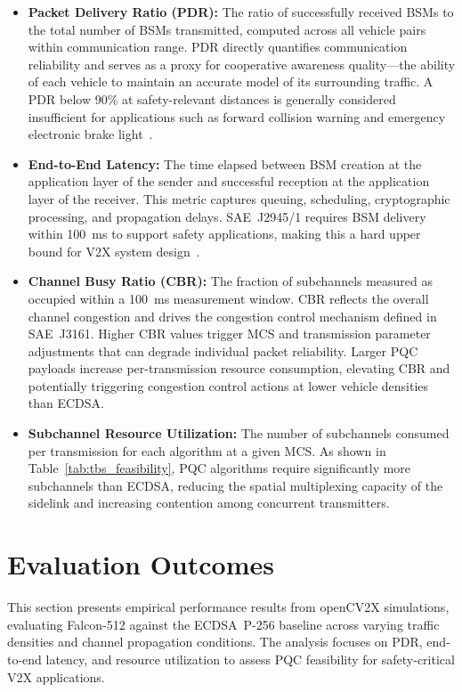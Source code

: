 \documentclass[letterpaper,journal]{IEEEtran}
\begin{document}
\begin{itemize}
    \item \textbf{Packet Delivery Ratio (PDR):} The ratio of successfully received BSMs to the total number of BSMs transmitted, computed across all vehicle pairs within communication range. PDR directly quantifies communication reliability and serves as a proxy for cooperative awareness quality---the ability of each vehicle to maintain an accurate model of its surrounding traffic. A PDR below 90\% at safety-relevant distances is generally considered insufficient for applications such as forward collision warning and emergency electronic brake light~\cite{twardokus2025chasm}.
    \item \textbf{End-to-End Latency:} The time elapsed between BSM creation at the application layer of the sender and successful reception at the application layer of the receiver. This metric captures queuing, scheduling, cryptographic processing, and propagation delays. SAE~J2945/1 requires BSM delivery within 100~ms to support safety applications, making this a hard upper bound for V2X system design~\cite{sae_j29451}.
    \item \textbf{Channel Busy Ratio (CBR):} The fraction of subchannels measured as occupied within a 100~ms measurement window. CBR reflects the overall channel congestion and drives the congestion control mechanism defined in SAE~J3161. Higher CBR values trigger MCS and transmission parameter adjustments that can degrade individual packet reliability. Larger PQC payloads increase per-transmission resource consumption, elevating CBR and potentially triggering congestion control actions at lower vehicle densities than ECDSA.
    \item \textbf{Subchannel Resource Utilization:} The number of subchannels consumed per transmission for each algorithm at a given MCS. As shown in Table~\ref{tab:tbs_feasibility}, PQC algorithms require significantly more subchannels than ECDSA, reducing the spatial multiplexing capacity of the sidelink and increasing contention among concurrent transmitters.
\end{itemize}

\section{Evaluation Outcomes}
\label{sec:results}

This section presents empirical performance results from openCV2X simulations, evaluating Falcon-512 against the ECDSA~P-256 baseline across varying traffic densities and channel propagation conditions. The analysis focuses on PDR, end-to-end latency, and resource utilization to assess PQC feasibility for safety-critical V2X applications.
\end{document}
